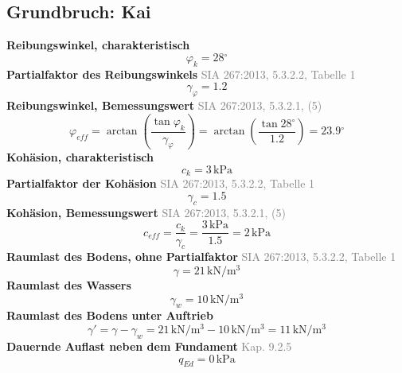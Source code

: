 \documentclass[11pt,a4paper]{article}
\newcommand{\normref}[1]{{\small\textcolor{gray}{#1}}}
\begin{document}
\subsection{Grundbruch: Kai}
\noindent\textbf{Reibungswinkel, charakteristisch}
\begin{equation*}
\varphi_k = 28{}^{\circ}
\end{equation*}
\noindent\textbf{Partialfaktor des Reibungswinkels} \hfill \normref{SIA 267:2013, 5.3.2.2, Tabelle 1}
\begin{equation*}
\gamma_{\varphi} = 1.2
\end{equation*}
\noindent\textbf{Reibungswinkel, Bemessungswert} \hfill \normref{SIA 267:2013, 5.3.2.1, (5)}
\begin{equation*}
\varphi_{eff} = \arctan\left(\frac{\tan \varphi_k}{\gamma_{\varphi}}\right) = \arctan\left(\frac{\tan 28{}^{\circ}}{1.2}\right) = 23.9{}^{\circ}
\end{equation*}
\noindent\textbf{Kohäsion, charakteristisch}
\begin{equation*}
c_k = 3\,\mathrm{kPa}
\end{equation*}
\noindent\textbf{Partialfaktor der Kohäsion} \hfill \normref{SIA 267:2013, 5.3.2.2, Tabelle 1}
\begin{equation*}
\gamma_c = 1.5
\end{equation*}
\noindent\textbf{Kohäsion, Bemessungswert} \hfill \normref{SIA 267:2013, 5.3.2.1, (5)}
\begin{equation*}
c_{eff} = \frac{c_k}{\gamma_c} = \frac{3\,\mathrm{kPa}}{1.5} = 2\,\mathrm{kPa}
\end{equation*}
\noindent\textbf{Raumlast des Bodens, ohne Partialfaktor} \hfill \normref{SIA 267:2013, 5.3.2.2, Tabelle 1}
\begin{equation*}
\gamma = 21\,\mathrm{kN}/\mathrm{m}^{3}
\end{equation*}
\noindent\textbf{Raumlast des Wassers}
\begin{equation*}
\gamma_w = 10\,\mathrm{kN}/\mathrm{m}^{3}
\end{equation*}
\noindent\textbf{Raumlast des Bodens unter Auftrieb}
\begin{equation*}
\gamma' = \gamma - \gamma_w = 21\,\mathrm{kN}/\mathrm{m}^{3} - 10\,\mathrm{kN}/\mathrm{m}^{3} = 11\,\mathrm{kN}/\mathrm{m}^{3}
\end{equation*}
\noindent\textbf{Dauernde Auflast neben dem Fundament} \hfill \normref{Kap. 9.2.5}
\begin{equation*}
q_{Ed} = 0\,\mathrm{kPa}
\end{equation*}
\end{document}
